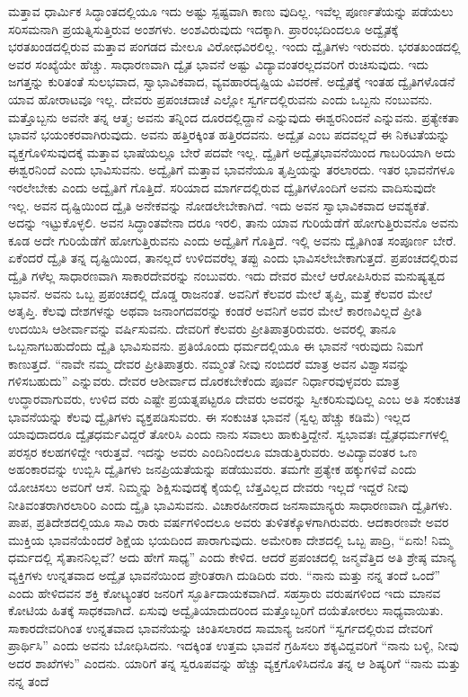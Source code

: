 ಮತ್ತಾವ ಧಾರ್ಮಿಕ ಸಿದ್ಧಾಂತದಲ್ಲಿಯೂ ಇದು ಅಷ್ಟು ಸ್ಪಷ್ಟವಾಗಿ ಕಾಣು ವುದಿಲ್ಲ. ಇವೆಲ್ಲ ಪೂರ್ಣತೆಯನ್ನು ಪಡೆಯಲು ಸರಿಸಮನಾಗಿ ಪ್ರಯತ್ನಿಸುತ್ತಿರುವ ಅಂಶಗಳು. ಅಂಶವಿರುವುದು ಇದಕ್ಕಾಗಿ. ಪ್ರಾರಂಭದಿಂದಲೂ ಅದ್ವೈತಕ್ಕೆ ಭರತಖಂಡದಲ್ಲಿರುವ ಮತ್ತಾವ ಪಂಗಡದ ಮೇಲೂ ವಿರೋಧವಿರಲಿಲ್ಲ. ಇಂದು ದ್ವೈತಿಗಳು ಇರುವರು. ಭರತಖಂಡದಲ್ಲಿ ಅವರ ಸಂಖ್ಯೆಯೇ ಹೆಚ್ಚು. ಸಾಧಾರಣವಾಗಿ ದ್ವೈತ ಭಾವನೆ ಅಷ್ಟು ವಿದ್ಯಾವಂತರಲ್ಲದವರಿಗೆ ರುಚಿಸುವುದು. ಇದು ಜಗತ್ತನ್ನು ಕುರಿತಂತೆ ಸುಲಭವಾದ, ಸ್ವಾಭಾವಿಕವಾದ, ವ್ಯವಹಾರದೃಷ್ಟಿಯ ವಿವರಣೆ. ಅದ್ವೈತಕ್ಕೆ ಇಂತಹ ದ್ವೈತಿಗಳೊಡನೆ ಯಾವ ಹೋರಾಟವೂ ಇಲ್ಲ. ದೇವರು ಪ್ರಪಂಚದಾಚೆ ಎಲ್ಲೋ ಸ್ವರ್ಗದಲ್ಲಿರುವನು ಎಂದು ಒಬ್ಬನು ನಂಬುವನು. ಮತ್ತೊಬ್ಬನು ಅವನೇ ತನ್ನ ಆತ್ಮ; ಅವನು ತನ್ನಿಂದ ದೂರದಲ್ಲಿದ್ದಾನೆ ಎನ್ನುವುದು ಈಶ್ವರನಿಂದನೆ ಎನ್ನುವನು. ಪ್ರತ್ಯೇಕತಾ ಭಾವನೆ ಭಯಂಕರವಾಗಿರುವುದು. ಅವನು ಹತ್ತಿರಕ್ಕಿಂತ ಹತ್ತಿರದವನು. ಅದ್ವೈತ ಎಂಬ ಪದವಲ್ಲದೆ ಈ ನಿಕಟತೆಯನ್ನು ವ್ಯಕ್ತಗೊಳಿಸುವುದಕ್ಕೆ ಮತ್ತಾವ ಭಾಷೆಯಲ್ಲೂ ಬೇರೆ ಪದವೇ ಇಲ್ಲ. ದ್ವೈತಿಗೆ ಅದ್ವೈತಭಾವನೆಯಿಂದ ಗಾಬರಿಯಾಗಿ ಅದು ಈಶ್ವರನಿಂದೆ ಎಂದು ಭಾವಿಸುವನು. ಅದ್ವೈತಿಗೆ ಮತ್ತಾವ ಭಾವನೆಯೂ ತೃಪ್ತಿಯನ್ನು ತರಲಾರದು. ಇತರ ಭಾವನೆಗಳೂ ಇರಲೇಬೇಕು ಎಂದು ಅದ್ವೈತಿಗೆ ಗೊತ್ತಿದೆ. ಸರಿಯಾದ ಮಾರ್ಗದಲ್ಲಿರುವ ದ್ವೈತಿಗಳೊಂದಿಗೆ ಅವನು ವಾದಿಸುವುದೇ ಇಲ್ಲ. ಅವನ ದೃಷ್ಟಿಯಿಂದ ದ್ವೈತಿ ಅನೇಕವನ್ನು ನೋಡಲೇಬೇಕಾಗಿದೆ. ಇದು ಅವನ ಸ್ವಾಭಾವಿಕವಾದ ಆವಶ್ಯಕತೆ. ಅದನ್ನು ಇಟ್ಟುಕೊಳ್ಳಲಿ. ಅವನ ಸಿದ್ಧಾಂತವೇನಾ ದರೂ ಇರಲಿ, ತಾನು ಯಾವ ಗುರಿಯೆಡೆಗೆ ಹೋಗುತ್ತಿರುವನೊ ಅವನು ಕೂಡ ಅದೇ ಗುರಿಯೆಡೆಗೆ ಹೋಗುತ್ತಿರುವನು ಎಂದು ಅದ್ವೈತಿಗೆ ಗೊತ್ತಿದೆ. ಇಲ್ಲಿ ಅವನು ದ್ವೈತಿಗಿಂತ ಸಂಪೂರ್ಣ ಬೇರೆ. ಏಕೆಂದರೆ ದ್ವೈತಿ ತನ್ನ ದೃಷ್ಟಿಯಿಂದ, ತಾನಲ್ಲದೆ ಉಳಿದವರೆಲ್ಲ ತಪ್ಪು ಎಂದು ಭಾವಿಸಲೇಬೇಕಾಗುತ್ತದೆ. ಪ್ರಪಂಚದಲ್ಲಿರುವ ದ್ವೈತಿ ಗಳೆಲ್ಲ ಸಾಧಾರಣವಾಗಿ ಸಾಕಾರದೇವರನ್ನು ನಂಬುವರು. ಇದು ದೇವರ ಮೇಲೆ ಆರೋಪಿಸಿರುವ ಮನುಷ್ಯತ್ವದ ಭಾವನೆ. ಅವನು ಒಬ್ಬ ಪ್ರಪಂಚದಲ್ಲಿ ದೊಡ್ಡ ರಾಜನಂತೆ. ಅವನಿಗೆ ಕೆಲವರ ಮೇಲೆ ತೃಪ್ತಿ, ಮತ್ತೆ ಕೆಲವರ ಮೇಲೆ ಅತೃಪ್ತಿ. ಕೆಲವು ದೇಶಗಳನ್ನು ಅಥವಾ ಜನಾಂಗದವರನ್ನು ಕಂಡರೆ ಅವನಿಗೆ ಅವರ ಮೇಲೆ ಕಾರಣವಿಲ್ಲದೆ ಪ್ರೀತಿ ಉದಯಿಸಿ ಆಶೀರ್ವಾವನ್ನು ವರ್ಷಿಸುವನು. ದೇವರಿಗೆ ಕೆಲವರು ಪ್ರೀತಿಪಾತ್ರರಿರುವರು. ಅವರಲ್ಲಿ ತಾನೂ ಒಬ್ಬನಾಗಬಹುದೆಂದು ದ್ವೈತಿ ಭಾವಿಸುವನು. ಪ್ರತಿಯೊಂದು ಧರ್ಮದಲ್ಲಿಯೂ ಈ ಭಾವನೆ ಇರುವುದು ನಿಮಗೆ ಕಾಣುತ್ತದೆ. “ನಾವೇ ನಮ್ಮ ದೇವರ ಪ್ರೀತಿಪಾತ್ರರು. ನಮ್ಮಂತೆ ನೀವು ನಂಬಿದರೆ ಮಾತ್ರ ಅವನ ವಿಶ್ವಾಸವನ್ನು ಗಳಿಸಬಹುದು” ಎನ್ನುವರು. ದೇವರ ಆಶೀರ್ವಾದ ದೊರಕಬೇಕೆಂದು ಪೂರ್ವ ನಿರ್ಧಾರವುಳ್ಳವರು ಮಾತ್ರ ಉದ್ಧಾರವಾಗುವರು, ಉಳಿದ ವರು ಎಷ್ಟೇ ಪ್ರಯತ್ನಪಟ್ಟರೂ ದೇವರು ಅವರನ್ನು ಸ್ವೀಕರಿಸುವುದಿಲ್ಲ ಎಂಬ ಅತಿ ಸಂಕುಚಿತ ಭಾವನೆಯನ್ನು ಕೆಲವು ದ್ವೈತಿಗಳು ವ್ಯಕ್ತಪಡಿಸುವರು. ಈ ಸಂಕುಚಿತ ಭಾವನೆ (ಸ್ವಲ್ಪ ಹೆಚ್ಚು ಕಡಿಮೆ) ಇಲ್ಲದ ಯಾವುದಾದರೂ ದ್ವೈತಧರ್ಮವಿದ್ದರೆ ತೋರಿಸಿ ಎಂದು ನಾನು ಸವಾಲು ಹಾಕುತ್ತಿದ್ದೇನೆ. ಸ್ವಭಾವತಃ ದ್ವೈತಧರ್ಮಗಳಲ್ಲಿ ಪರಸ್ಪರ ಕಲಹಗಳಿದ್ದೇ ಇರುತ್ತವೆ. ಇದನ್ನು ಅವರು ಎಂದಿನಿಂದಲೂ ಮಾಡುತ್ತಿರುವರು. ಅವಿದ್ಯಾವಂತರ ಒಣ ಅಹಂಕಾರವನ್ನು ಉಬ್ಬಿಸಿ ದ್ವೈತಿಗಳು ಜನಪ್ರಿಯತೆಯನ್ನು ಪಡೆಯುವರು. ತಮಗೇ ಪ್ರತ್ಯೇಕ ಹಕ್ಕುಗಳಿವೆ ಎಂದು ಯೋಚಿಸಲು ಅವರಿಗೆ ಆಸೆ. ನಿಮ್ಮನ್ನು ಶಿಕ್ಷಿಸುವುದಕ್ಕೆ ಕೈಯಲ್ಲಿ ಬೆತ್ತವಿಲ್ಲದ ದೇವರು ಇಲ್ಲದೆ ಇದ್ದರೆ ನೀವು ನೀತಿವಂತರಾಗಿರಲಾರಿರಿ ಎಂದು ದ್ವೈತಿ ಭಾವಿಸುವನು. ವಿಚಾರಹೀನರಾದ ಜನಸಾಮಾನ್ಯರು ಸಾಧಾರಣವಾಗಿ ದ್ವೈತಿಗಳು. ಪಾಪ, ಪ್ರತಿದೇಶದಲ್ಲಿಯೂ ಸಾವಿ ರಾರು ವರ್ಷಗಳಿಂದಲೂ ಅವರು ತುಳಿತಕ್ಕೊಳಗಾಗಿರುವರು. ಆದಕಾರಣವೇ ಅವರ ಮುಕ್ತಿಯ ಭಾವನೆಯೆಂದರೆ ಶಿಕ್ಷೆಯ ಭಯದಿಂದ ಪಾರಾಗುವುದು. ಅಮೇರಿಕಾ ದೇಶದಲ್ಲಿ ಒಬ್ಬ ಪಾದ್ರಿ, “ಏನು! ನಿಮ್ಮ ಧರ್ಮದಲ್ಲಿ ಸೈತಾನನಿಲ್ಲವೆ? ಅದು ಹೇಗೆ ಸಾಧ್ಯ” ಎಂದು ಕೇಳಿದ. ಆದರೆ ಪ್ರಪಂಚದಲ್ಲಿ ಜನ್ಮವೆತ್ತಿದ ಅತಿ ಶ್ರೇಷ್ಠ ಮಾನ್ಯ ವ್ಯಕ್ತಿಗಳು ಉನ್ನತವಾದ ಅದ್ವೈತ ಭಾವನೆಯಿಂದ ಪ್ರೇರಿತರಾಗಿ ದುಡಿದಿರು ವರು. “ನಾನು ಮತ್ತು ನನ್ನ ತಂದೆ ಒಂದೆ” ಎಂದು ಹೇಳಿದವನ ಶಕ್ತಿ ಕೋಟ್ಯಂತರ ಜನರಿಗೆ ಸ್ಫೂರ್ತಿದಾಯಕವಾಗಿದೆ. ಸಹಸ್ರಾರು ವರುಷಗಳಿಂದ ಇದು ಮಾನವ ಕೋಟಿಯ ಹಿತಕ್ಕೆ ಸಾಧಕವಾಗಿದೆ. ಏಸುವು ಅದ್ವೈತಿಯಾದುದರಿಂದ ಮತ್ತೊಬ್ಬರಿಗೆ ದಯೆತೋರಲು ಸಾಧ್ಯವಾಯಿತು. ಸಾಕಾರದೇವರಿಗಿಂತ ಉನ್ನತವಾದ ಭಾವನೆಯನ್ನು ಚಿಂತಿಸಲಾರದ ಸಾಮಾನ್ಯ ಜನರಿಗೆ “ಸ್ವರ್ಗದಲ್ಲಿರುವ ದೇವರಿಗೆ ಪ್ರಾರ್ಥಿಸಿ” ಎಂದು ಅವನು ಬೋಧಿಸಿದನು. ಇದಕ್ಕಿಂತ ಉತ್ತಮ ಭಾವನೆ ಗ್ರಹಿಸಲು ಶಕ್ಯವಿದ್ದವರಿಗೆ “ನಾನು ಬಳ್ಳಿ, ನೀವು ಅದರ ಶಾಖೆಗಳು” ಎಂದನು. ಯಾರಿಗೆ ತನ್ನ ಸ್ವರೂಪವನ್ನು ಹೆಚ್ಚು ವ್ಯಕ್ತಗೊಳಿಸಿದನೊ ತನ್ನ ಆ ಶಿಷ್ಯರಿಗೆ “ನಾನು ಮತ್ತು ನನ್ನ ತಂದೆ 